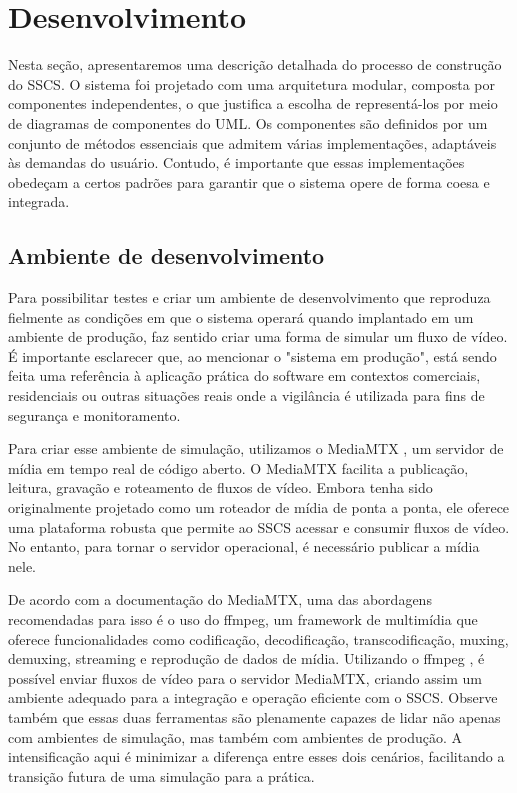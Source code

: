 \documentclass[12pt, %
openright, 
oneside, %
a4paper,    %
brazil]{facom-ufu-abntex2}
\begin{document}


\chapter{Desenvolvimento}

Nesta seção, apresentaremos uma descrição detalhada do processo de construção
do SSCS. O sistema foi projetado com uma arquitetura modular, composta por
componentes independentes, o que justifica a escolha de representá-los por meio
de diagramas de componentes do UML. Os componentes são definidos por um
conjunto de métodos essenciais que admitem várias implementações, adaptáveis às
demandas do usuário. Contudo, é importante que essas implementações obedeçam a
certos padrões para garantir que o sistema opere de forma coesa e integrada.

\section{Ambiente de desenvolvimento}

Para possibilitar testes e criar um ambiente de desenvolvimento que reproduza
fielmente as condições em que o sistema operará quando implantado em um
ambiente de produção, faz sentido criar uma forma de simular um fluxo de vídeo.
É importante esclarecer que, ao mencionar o "sistema em produção", está sendo
feita uma referência à aplicação prática do software em contextos comerciais,
residenciais ou outras situações reais onde a vigilância é utilizada para fins
de segurança e monitoramento.

Para criar esse ambiente de simulação, utilizamos o MediaMTX \cite{mediamtx},
um servidor de mídia em tempo real de código aberto. O MediaMTX facilita a
publicação, leitura, gravação e roteamento de fluxos de vídeo. Embora tenha
sido originalmente projetado como um roteador de mídia de ponta a ponta, ele
oferece uma plataforma robusta que permite ao SSCS acessar e consumir fluxos de
vídeo. No entanto, para tornar o servidor operacional, é necessário publicar a
mídia nele.

De acordo com a documentação do MediaMTX, uma das abordagens recomendadas para
isso é o uso do ffmpeg, um framework de multimídia que oferece funcionalidades
como codificação, decodificação, transcodificação, muxing, demuxing, streaming
e reprodução de dados de mídia. Utilizando o ffmpeg \cite{ffmpeg}, é possível
enviar fluxos de vídeo para o servidor MediaMTX, criando assim um ambiente
adequado para a integração e operação eficiente com o SSCS. Observe também que
essas duas ferramentas são plenamente capazes de lidar não apenas com ambientes
de simulação, mas também com ambientes de produção. A intensificação aqui é
minimizar a diferença entre esses dois cenários, facilitando a transição futura
de uma simulação para a prática.
\end{document}
